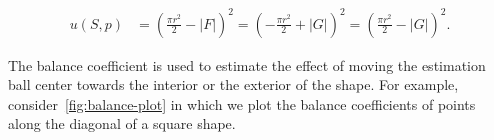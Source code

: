 \begin{align*}
	u(S,p) &= \left( \frac{\pi r^2}{2} - |F| \right)^2 = \left( -\frac{\pi r^2}{2} + |G| \right)^2 = \left( \frac{\pi r^2}{2} - |G| \right)^2.
\end{align*}

The balance coefficient is used to estimate the effect of moving the estimation ball center towards the interior or the exterior of the shape. For example, consider~\cref{fig:balance-plot} in which we plot the balance coefficients of points along the diagonal of a square shape. 

\begin{figure}
\center
\begin{minipage}{0.25\textwidth}
\\%
\\%

\end{minipage}
\end{figure}
